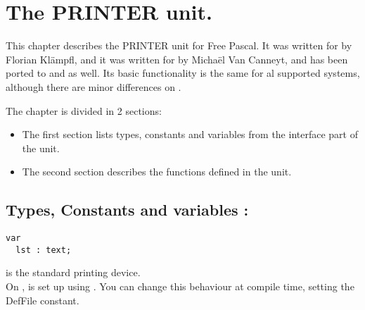 %
%
%
%
%
\chapter{The PRINTER unit.}
This chapter describes the PRINTER unit for Free Pascal. It was written for
\dos by Florian Kl\"ampfl, and it was written for \linux by Micha\"el Van 
Canneyt, and has been ported to \windows and \ostwo as well. 
Its basic functionality is the same for al supported systems, although there 
are minor differences on \linux.

The chapter is divided in 2 sections:
\begin{itemize}
\item The first section lists types, constants and variables from the
interface part of the unit.
\item The second section describes the functions defined in the unit.
\end{itemize}
\section {Types, Constants and variables : }
\begin{verbatim}
var 
  lst : text;
\end{verbatim}
 is the standard printing device. \\ On \linux, 
 is set up using . 
You can change this behaviour at compile time, setting the DefFile constant.
